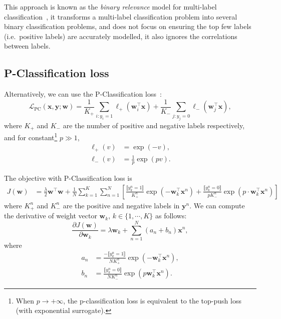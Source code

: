 \documentclass[9pt]{extarticle}
\newcommand{\llb}{\llbracket}
\newcommand{\rrb}{\rrbracket}
\newcommand{\x}{\mathbf{x}}
\newcommand{\y}{\mathbf{y}}
\newcommand{\1}{\mathbf{1}}
\newcommand{\w}{\mathbf{w}}
\newcommand{\LCal}{\mathcal{L}}
\newcommand{\ie}{i.e.\ }
\begin{document}
This approach is known as the \emph{binary relevance} model for multi-label classification~\cite{read2011classifier},
it transforms a multi-label classification problem into several binary classification problems, 
and does not focus on ensuring the top few labels (\ie positive labels) are accurately modelled,
it also ignores the correlations between labels.


\subsection{P-Classification loss}
\label{ssec:pclass}

Alternatively, we can use the P-Classification loss~\cite{ertekin2011equivalence}:
\begin{equation}
\label{eq:loss_pclass}
\LCal_\text{PC}(\x, \y; \w) = \frac{1}{K_+} \sum_{i:y_i=1} \ell_+(\w_i^\top \x) + \frac{1}{K_-} \sum_{j:y_j=0} \ell_-(\w_j^\top \x),
\end{equation}
where $K_+$ and $K_-$ are the number of positive and negative labels respectively,
and for constant\footnote{When $p \to +\infty$, the p-classification loss is equivalent to the top-push loss (with exponential surrogate).}
$p \gg 1$,
\begin{equation}
\begin{aligned}
\ell_+(v) & = \exp(-v), \\
\ell_-(v) & = \frac{1}{p} \exp(pv).
\end{aligned}
\end{equation}

The objective with P-Classification loss is
\begin{align*}
J(\w) 
&= \frac{\lambda}{2} \w^\top \w + \frac{1}{N} \sum_{k=1}^K \sum_{n=1}^N \left[
   \frac{\llb y_k^n = 1 \rrb}{K_+^n} \exp(-\w_k^\top \x^n) + 
   \frac{\llb y_k^n = 0 \rrb}{p K_-^n} \exp(p \cdot \w_k^\top \x^n) \right]
\end{align*}
where $K_+^n$ and $K_-^n$ are the positive and negative labels in $\y^n$.
We can compute the derivative of weight vector $\w_k, \, k \in \{1,\cdots,K\}$ as follows:
\begin{equation}
\label{eq:grad_pclass}
\frac{\partial J(\w)} {\partial \w_k} = \lambda \w_k + \sum_{n=1}^N (a_n + b_n) \x^n,
\end{equation}
where
\begin{align*}
a_n &= \frac{-\llb y_k^n=1 \rrb} {N K_+^n} \exp( -\w_k^\top \x^n), \\
b_n &= \frac{ \llb y_k^n=0 \rrb} {N K_-^n} \exp(p \w_k^\top \x^n).
\end{align*}
\end{document}
